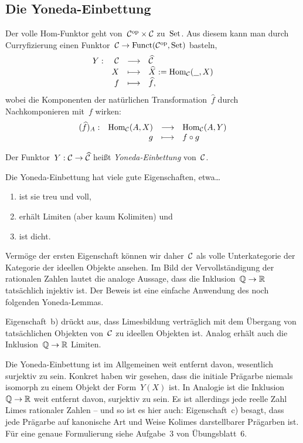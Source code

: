 \subsection{Die Yoneda-Einbettung}

Der volle Hom-Funktor geht von~$\mathcal{C}^{\mathrm{op}} \times \mathcal{C}$ zu~$\mathrm{Set}$. Aus diesem kann
man durch Curryfizierung einen Funktor~$\mathcal{C} \to \mathrm{Funct}(\mathcal{C}^{\mathrm{op}},\mathrm{Set})$ basteln,
\[ \begin{array}{@{}rrcl@{}}
  Y : & \C &\longrightarrow& \widehat\C \\
  & X &\longmapsto& \widehat X := \Hom_\C(\freist,X) \\
  & f &\longmapsto& \widehat f,
\end{array} \]
wobei die Komponenten der natürlichen Transformation~$\widehat f$ durch
Nachkomponieren mit~$f$ wirken:
\[ \begin{array}{@{}rrcl@{}}
  (\widehat f)_A : & \Hom_\C(A,X) &\longrightarrow& \Hom_\C(A,Y) \\
  & g &\longmapsto& f \circ g
\end{array} \]

\begin{defn}Der Funktor~$Y:\mathcal{C}\to\widehat{\mathcal{C}}$ heißt \emph{Yoneda-Einbettung}
von~$\mathcal{C}$.\end{defn}

Die Yoneda-Einbettung hat viele gute Eigenschaften, etwa\ldots
\begin{enumerate}
\item ist sie treu und voll,
\item erhält Limiten (aber kaum Kolimiten) und
\item ist dicht.
\end{enumerate}
Vermöge der ersten Eigenschaft können wir daher~$\mathcal{C}$ als volle Unterkategorie
der Kategorie der ideellen Objekte ansehen. Im Bild der Vervollständigung der
rationalen Zahlen lautet die analoge Aussage, dass die Inklusion~$\mathbb{Q} \to \mathbb{R}$
tatsächlich injektiv ist. Der Beweis ist eine einfache
Anwendung des noch folgenden Yoneda-Lemmas.

Eigenschaft~b) drückt aus, dass Limesbildung verträglich mit dem Übergang von
tat\-säch\-li\-chen Objekten von~$\mathcal{C}$ zu ideellen Objekten ist. Analog erhält auch die
Inklusion~$\mathbb{Q} \to \mathbb{R}$ Limiten.

Die Yoneda-Einbettung ist im Allgemeinen weit entfernt davon, wesentlich
surjektiv zu sein. Konkret haben wir gesehen, dass die initiale Prägarbe
niemals isomorph zu einem Objekt der Form~$Y(X)$ ist. In Analogie ist die
Inklusion~$\mathbb{Q} \to \mathbb{R}$ weit entfernt davon, surjektiv zu sein. Es ist
allerdings jede reelle Zahl Limes rationaler Zahlen -- und so ist es hier auch:
Eigenschaft~c) besagt, dass jede Prägarbe auf kanonische Art und Weise Kolimes
darstellbarer Prägarben ist. Für eine genaue Formulierung siehe Aufgabe~3 von
Übungsblatt~6.


